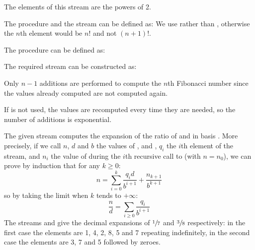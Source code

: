 \begin{exe}[3.53]
    The elements of this stream are the powers of 2.
\end{exe}

\begin{exe}[3.54]
    The procedure  and the stream  can be 
    defined as:
    We use  rather than , otherwise 
    the $n$th element would be $n!$ and not $(n + 1)!$.
\end{exe}

\begin{exe}[3.55]
    The procedure  can be defined as:
\end{exe}

\begin{exe}[3.56]
    The required stream can be constructed as:
\end{exe}

\begin{exe}[3.57]
    Only $n - 1$ additions are performed to compute the $n$th Fibonacci number 
    since the values already computed are not computed again.

    If  is not used, the values are recomputed every time they 
    are needed, so the number of additions is exponential.
\end{exe}

\begin{exe}[3.58]
    The given stream computes the expansion of the ratio of  and 
     in basis . More precisely, if we call $n$, $d$ and 
    $b$ the values of ,  and , $q_i$ the $i$th 
    element of the stream, and $n_i$ the value of  during the $i$th 
    recursive call to  (with $n = n_0$), we can prove by induction 
    that for any $k \geq 0$:
    \[
    n = \sum_{i = 0}^{k} \frac{q_i d}{b^{i + 1}} + \frac{n_{k + 1}}{b^{k + 1}}
    \]
    so by taking the limit when $k$ tends to $+\infty$:
    \[
	\frac{n}{d} = \sum_{i \geq 0} \frac{q_i}{b^{i + 1}}
    \]
    The streams  and  give the 
    decimal expansions of $\sfrac{1}{7}$ and $\sfrac{3}{8}$ respectively: in the 
    first case the elements are 1, 4, 2, 8, 5 and 7 repeating indefinitely, in 
    the second case the elements are 3, 7 and 5 followed by zeroes.
\end{exe}

